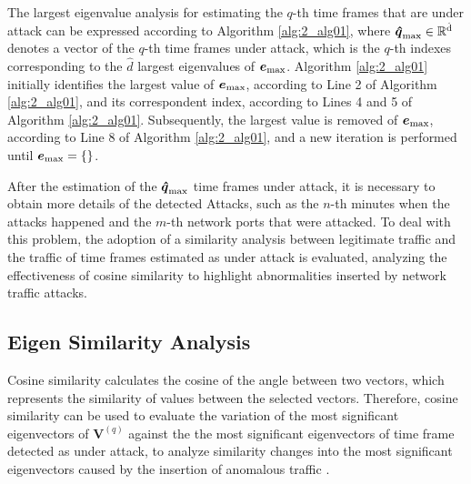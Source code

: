 The largest eigenvalue analysis for estimating the $q$-th time frames that are under attack can be expressed according to Algorithm \ref{alg:2_alg01}, where $\rm{\boldsymbol{\hat{q}}}_{\rm max} \in \mathbb{R}^{\hat{d}}$ denotes a vector of the $q$-th time frames under attack, which is the $q$-th indexes corresponding to the $\hat{d}$ largest eigenvalues of $\boldsymbol{e}_{\rm max}$. Algorithm \ref{alg:2_alg01} initially identifies the largest value of $\boldsymbol{e}_{\rm max}$, according to Line 2 of Algorithm \ref{alg:2_alg01}, and its correspondent index, according to Lines 4 and 5 of Algorithm \ref{alg:2_alg01}. Subsequently, the largest value is removed of $\boldsymbol{e}_{\rm max}$, according to Line 8 of Algorithm \ref{alg:2_alg01}, and a new iteration is performed until $\boldsymbol{e}_{\rm max} = \{\}$.


After the estimation of the $\rm{\boldsymbol{\hat{q}}}_{\rm max}$ time frames under attack, it is necessary to obtain more details of the detected Attacks, such as the $n$-th minutes when the attacks happened and the $m$-th network ports that were attacked. To deal with this problem, the adoption of a similarity analysis between legitimate traffic and the traffic of time frames estimated as under attack is evaluated, analyzing the effectiveness of cosine similarity to highlight abnormalities inserted by network traffic attacks. 

\subsection{Eigen Similarity Analysis}
\label{sec:2_prop_EigenSimilarityAnalysis}

Cosine similarity calculates the cosine of the angle between two vectors, which represents the similarity of values between the selected vectors. Therefore, cosine similarity can be used to evaluate the variation of the most significant eigenvectors of $\boldsymbol{V}^{(q)}$ against the the most significant eigenvectors of time frame detected as under attack, to analyze similarity changes into the most significant eigenvectors caused by the insertion of anomalous traffic \cite{Lee2013}. 

